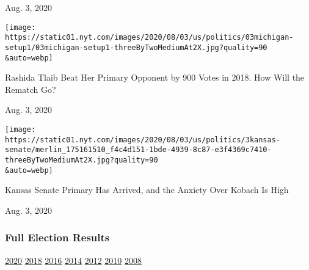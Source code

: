 Aug. 3, 2020

\href{https://www.nytimes.com/2020/08/03/us/politics/michigan-primary-rashida-tlaib-brenda-jones.html?action=click\&module=ELEX_results\&pgtype=Interactive\&region=RelatedCoverage}{}

\texttt{[image: https://static01.nyt.com/images/2020/08/03/us/politics/03michigan-setup1/03michigan-setup1-threeByTwoMediumAt2X.jpg?quality=90\\\&auto=webp]}

Rashida Tlaib Beat Her Primary Opponent by 900 Votes in 2018. How Will
the Rematch Go?

Aug. 3, 2020

\href{https://www.nytimes.com/2020/08/03/us/politics/kris-kobach-kansas-senate-primary.html?action=click\&module=ELEX_results\&pgtype=Interactive\&region=RelatedCoverage}{}

\texttt{[image: https://static01.nyt.com/images/2020/08/03/us/politics/3kansas-senate/merlin\_175161510\_f4c4d151-1bde-4939-8c87-e3f4369c7410-threeByTwoMediumAt2X.jpg?quality=90\\\&auto=webp]}

Kansas Senate Primary Has Arrived, and the Anxiety Over Kobach Is High

Aug. 3, 2020

\hypertarget{full-election-results}{%
\subsubsection{Full Election Results}\label{full-election-results}}

\href{https://www.nytimes.com/interactive/2020/us/elections/delegate-count-primary-results.html?action=click\&module=ELEX_results\&pgtype=Interactive\&region=PastResultsFooter}{2020}
\href{https://www.nytimes.com/interactive/2018/us/elections/calendar-primary-results.html?action=click\&module=ELEX_results\&pgtype=Interactive\&region=PastResultsFooter}{2018}
\href{https://www.nytimes.com/elections/2016/results/president?action=click\&module=ELEX_results\&pgtype=Interactive\&region=PastResultsFooter}{2016}
\href{https://www.nytimes.com/elections/2014/results/senate?action=click\&module=ELEX_results\&pgtype=Interactive\&region=PastResultsFooter}{2014}
\href{https://www.nytimes.com/elections/2012/results/president.html?action=click\&module=ELEX_results\&pgtype=Interactive\&region=PastResultsFooter}{2012}
\href{https://www.nytimes.com/elections/2010/results/senate.html?action=click\&module=ELEX_results\&pgtype=Interactive\&region=PastResultsFooter}{2010}
\href{https://www.nytimes.com/elections/2008/results/president/map.html?action=click\&module=ELEX_results\&pgtype=Interactive\&region=PastResultsFooter}{2008}

